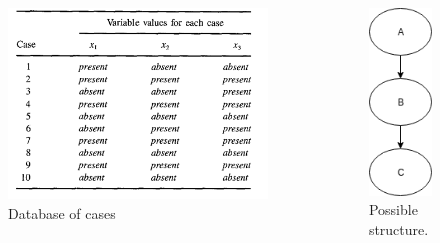 \begin{frame}


        \begin{columns}
	    \centering
        \begin{figure}[!h]
            \centering
            \includegraphics[scale=0.45]{figuras/cases_cooper.png}
            \caption{Database of cases}
            \label{fig:casesCoop}
        \end{figure}
        \centering
        \begin{figure}[!h]
            \centering
            \includegraphics[scale=0.45]{figuras/typicOrder.png}
            \caption{Possible structure.}
            \label{fig:casesCoop}
        \end{figure}
	      
    \end{columns}
\end{frame}
    
\begin{frame}

  
\end{frame}





